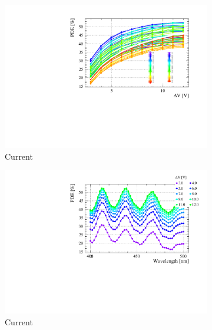 \begin{landscape}  
\begin{figure}[htbp]
    \centering
    \begin{subfigure}{0.65\textwidth}
        \includegraphics[width=\linewidth]{gfx/plots/PDE/42/c_Current_Bias.pdf}  
        \caption{Current}
    \end{subfigure}
    \begin{subfigure}{0.65\textwidth}
        \includegraphics[width=\linewidth]{gfx/plots/PDE/42/c_Current_Wavelength.pdf}  
        \caption{Current}
    \end{subfigure}
    \\
    \begin{subfigure}{0.65\textwidth}

\end{subfigure}
\end{figure}
\end{landscape}
